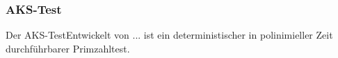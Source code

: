 		\begin{comment}
		Wichtig: wegen +-1
		
				Ein interessanter Aspekt des Satzes von Fermat ist folgender: Sei p eine ungerade
				Primzahl und a zu p teilerfremd. Dann gilt (a(p−1)/2)2 ≡ 1 mod p. Da die Gleichung
				x2 = 1 im Körper Fp nur die Lösungen x = ±1 hat, folgt also a(p−1)/2 ≡ ±1 mod p
		\end{comment}	
		\subsubsection{AKS-Test}
		Der AKS-TestEntwickelt von ... ist ein deterministischer in polinimieller Zeit durchführbarer Primzahltest. 
		
		
		